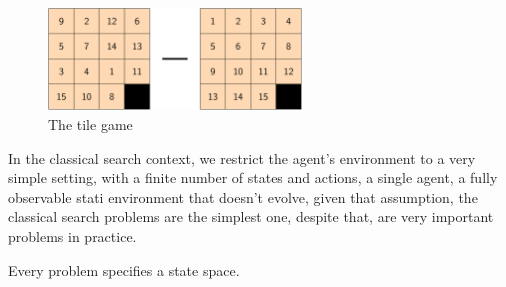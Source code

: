 \documentclass[10pt, letterpaper]{report}
\begin{document}
\begin{figure}[h!]
    \centering
    \includegraphics[width=0.6\textwidth ]{images/tile.png}
    \caption{The tile game}
    \label{img:tiles}
\end{figure}

In the classical search context, we restrict the agent's environment to a very simple setting, with a finite number of states and actions, a single agent, a fully observable stati environment that doesn't evolve, given that assumption, the classical search problems are the simplest one, despite that, are very important problems in practice.\bigskip

\noindent Every problem specifies a state space.
\end{document}
